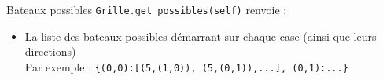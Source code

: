 
\begin{frame}{Bateaux possibles}
\texttt{Grille.get\_possibles(self)} renvoie :
\begin{itemize}
\item La liste des bateaux possibles démarrant sur chaque case (ainsi que leurs directions)\\
Par exemple : \texttt{\{(0,0):[(5,(1,0)), (5,(0,1)),...], (0,1):...\}}
\end{itemize}
\end{frame}

